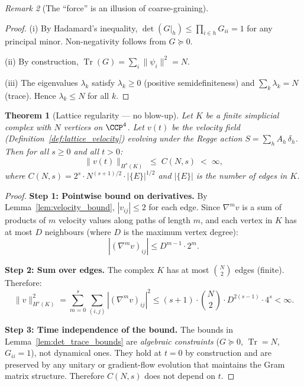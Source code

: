\documentclass[12pt]{article}
\newtheorem{theorem}{Theorem}[section]
\theoremstyle{remark}
\newtheorem{remark}[theorem]{Remark}
\theoremstyle{definition}
\newcommand{\tr}{\operatorname{Tr}}
\begin{document}
\begin{remark}[The ``force'' is an illusion of coarse-graining]
\begin{proof}
(i) By Hadamard's inequality, $\det(G|_h) \leq \prod_{i \in h} G_{ii}
= 1$ for any principal minor.  Non-negativity follows from
$G \succeq 0$.

(ii) By construction, $\tr(G) = \sum_i \|\psi_i\|^2 = N$.

(iii) The eigenvalues $\lambda_k$ satisfy $\lambda_k \geq 0$
(positive semidefiniteness) and $\sum_k \lambda_k = N$ (trace).
Hence $\lambda_k \leq N$ for all $k$.
\end{proof}

\begin{theorem}[Lattice regularity --- no blow-up]
\label{thm:lattice_regularity}
Let $K$ be a finite simplicial complex with $N$ vertices on $\CCP^4$.
Let $v(t)$ be the velocity field (Definition~\ref{def:lattice_velocity})
evolving under the Regge action $S = \sum_h A_h\,\delta_h$.
Then for all $s \geq 0$ and all $t > 0$:
\begin{equation}
\boxed{\|v(t)\|_{H^s(K)} \;\leq\; C(N, s) \;<\; \infty,}
\end{equation}
where $C(N,s) = 2^s \cdot N^{(s+1)/2} \cdot |\{E\}|^{1/2}$ and
$|\{E\}|$ is the number of edges in $K$.
\end{theorem}

\begin{proof}
\textbf{Step 1: Pointwise bound on derivatives.}
By Lemma~\ref{lem:velocity_bound}, $|v_{ij}| \leq 2$ for each edge.
Since $\nabla^m v$ is a sum of products of $m$ velocity values along
paths of length $m$, and each vertex in $K$ has at most $D$ neighbours
(where $D$ is the maximum vertex degree):
\begin{equation}
|(\nabla^m v)_{ij}| \leq D^{m-1} \cdot 2^m.
\end{equation}

\textbf{Step 2: Sum over edges.}
The complex $K$ has at most $\binom{N}{2}$ edges (finite).  Therefore:
\begin{equation}
\|v\|_{H^s(K)}^2 = \sum_{m=0}^{s} \sum_{(i,j)} |(\nabla^m v)_{ij}|^2
\leq (s+1) \cdot \binom{N}{2} \cdot D^{2(s-1)} \cdot 4^s < \infty.
\end{equation}

\textbf{Step 3: Time independence of the bound.}
The bounds in Lemma~\ref{lem:det_trace_bounds} are
\emph{algebraic constraints} ($G \succeq 0$, $\tr = N$, $G_{ii} = 1$),
not dynamical ones.  They hold at $t = 0$ by construction and are
preserved by any unitary or gradient-flow evolution that maintains the
Gram matrix structure.  Therefore $C(N,s)$ does not depend on $t$.
\end{proof}


\end{remark}
\end{document}

